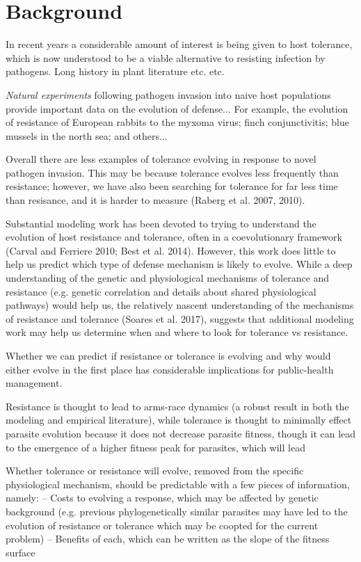 \documentclass{article}
\begin{document}
\section*{Background}

In recent years a considerable amount of interest is being given to host tolerance, which is now understood to be a viable alternative to resisting infection by pathogens. Long history in plant literature etc. etc.

\emph{Natural experiments} following pathogen invasion into naive host populations provide important data on the evolution of defense... For example, the evolution of resistance of European rabbits to the myxoma virus; finch conjunctivitis; blue mussels in the north sea; and others... 

Overall there are less examples of tolerance evolving in response to novel pathogen invasion. This may be because tolerance evolves less frequently than resistance; however, we have also been searching for tolerance for far less time than resisance, and it is harder to measure (Raberg et al. 2007, 2010).

Substantial modeling work has been devoted to trying to understand the evolution of host resistance and tolerance, often in a coevolutionary framework (Carval and Ferriere 2010; Best et al. 2014). However, this work does little to help us predict which type of defense mechanism is likely to evolve. While a deep understanding of the genetic and physiological mechanisms of tolerance and resistance (e.g. genetic correlation and details about shared physiological pathways) would help us, the relatively nascent understanding of the mechanisms of resistance and tolerance (Soares et al. 2017), suggests that additional modeling work may help us determine when and where to look for tolerance vs resistance.

Whether we can predict if resistance or tolerance is evolving and why would either evolve in the first place has considerable implications for public-health management. 

Resistance is thought to lead to arms-race dynamics (a robust result in both the modeling and empirical literature), while tolerance is thought to minimally effect parasite evolution because it does not decrease parasite fitness, though it can lead to the emergence of a higher fitness peak for parasites, which will lead

Whether tolerance or resistance will evolve, removed from the specific physiological mechanism, should be predictable with a few pieces of information, namely:
-- Costs to evolving a response, which may be affected by genetic background (e.g. previous phylogenetically similar parasites may have led to the evolution of resistance or tolerance which may be coopted for the current problem)
-- Benefits of each, which can be written as the slope of the fitness surface
\end{document}
